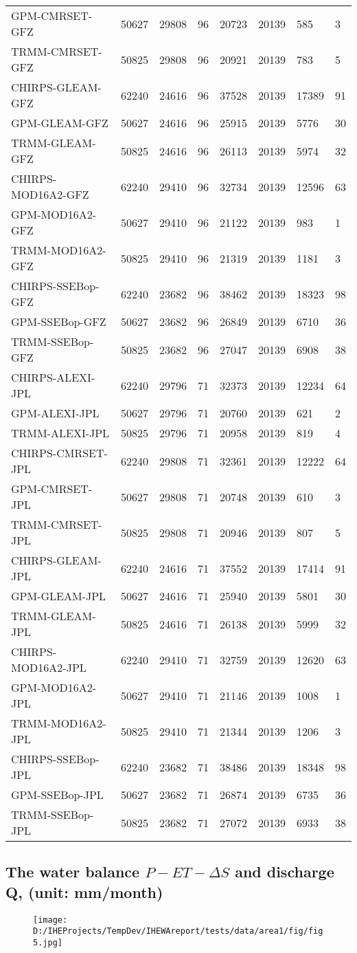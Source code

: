 \documentclass{article}%
\begin{document}
\begin{longtable}{|l|l|l|l|l|l|l|l|}
GPM-CMRSET-GFZ&50627&29808&96&20723&20139&585&3\\%
TRMM-CMRSET-GFZ&50825&29808&96&20921&20139&783&5\\%
CHIRPS-GLEAM-GFZ&62240&24616&96&37528&20139&17389&91\\%
GPM-GLEAM-GFZ&50627&24616&96&25915&20139&5776&30\\%
TRMM-GLEAM-GFZ&50825&24616&96&26113&20139&5974&32\\%
CHIRPS-MOD16A2-GFZ&62240&29410&96&32734&20139&12596&63\\%
GPM-MOD16A2-GFZ&50627&29410&96&21122&20139&983&1\\%
TRMM-MOD16A2-GFZ&50825&29410&96&21319&20139&1181&3\\%
CHIRPS-SSEBop-GFZ&62240&23682&96&38462&20139&18323&98\\%
GPM-SSEBop-GFZ&50627&23682&96&26849&20139&6710&36\\%
TRMM-SSEBop-GFZ&50825&23682&96&27047&20139&6908&38\\%
CHIRPS-ALEXI-JPL&62240&29796&71&32373&20139&12234&64\\%
GPM-ALEXI-JPL&50627&29796&71&20760&20139&621&2\\%
TRMM-ALEXI-JPL&50825&29796&71&20958&20139&819&4\\%
CHIRPS-CMRSET-JPL&62240&29808&71&32361&20139&12222&64\\%
GPM-CMRSET-JPL&50627&29808&71&20748&20139&610&3\\%
TRMM-CMRSET-JPL&50825&29808&71&20946&20139&807&5\\%
CHIRPS-GLEAM-JPL&62240&24616&71&37552&20139&17414&91\\%
GPM-GLEAM-JPL&50627&24616&71&25940&20139&5801&30\\%
TRMM-GLEAM-JPL&50825&24616&71&26138&20139&5999&32\\%
CHIRPS-MOD16A2-JPL&62240&29410&71&32759&20139&12620&63\\%
GPM-MOD16A2-JPL&50627&29410&71&21146&20139&1008&1\\%
TRMM-MOD16A2-JPL&50825&29410&71&21344&20139&1206&3\\%
CHIRPS-SSEBop-JPL&62240&23682&71&38486&20139&18348&98\\%
GPM-SSEBop-JPL&50627&23682&71&26874&20139&6735&36\\%
TRMM-SSEBop-JPL&50825&23682&71&27072&20139&6933&38\\%
\end{longtable}

%
\newpage%
\RaggedRight%
\subsection*{The water balance $P-ET-\Delta S$ and discharge Q, (unit: mm/month)}%
\label{subsec:ThewaterbalanceP{-}ET{-}DeltaSanddischargeQ,(unitmm/month)}%
%


\begin{figure}[H]%
\centering%
\texttt{[image: D:/IHEProjects/TempDev/IHEWAreport/tests/data/area1/fig/fig5.jpg]}%
\label{figure:ann1}%
\end{figure}

%
\newpage

%
\cleardoublepage%
\end{document}
